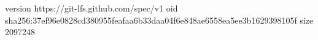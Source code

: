version https://git-lfs.github.com/spec/v1
oid sha256:37ef96e0828cd380955feafaa6b33daa04f6e848ae6558ea5ee3b1629398105f
size 2097248
